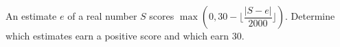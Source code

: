 An estimate $e$ of a real number $S$ scores $\max(0,30-\lfloor\dfrac{|S-e|}{2000}\rfloor)$. Determine which estimates earn a positive score and which earn 30.

